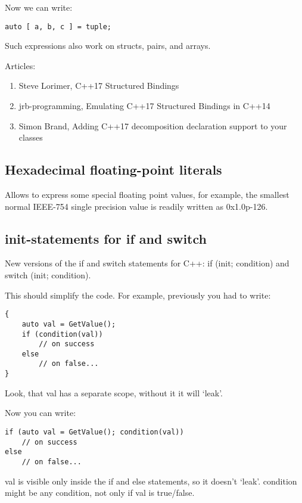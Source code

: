 Now we can write:

\begin{verbatim}
auto [ a, b, c ] = tuple;
\end{verbatim}

Such expressions also work on structs, pairs, and arrays.

Articles:
\begin{enumerate}
\item Steve Lorimer, C++17 Structured Bindings
\item jrb-programming, Emulating C++17 Structured Bindings in C++14
\item Simon Brand, Adding C++17 decomposition declaration support to your classes
\end{enumerate}

\subsection{Hexadecimal floating-point literals}

Allows to express some special floating point values, for example, the smallest normal IEEE-754 single precision value is readily written as 0x1.0p-126.

\subsection{init-statements for if and switch}

New versions of the if and switch statements for C++: if (init; condition) and switch (init; condition). 

This should simplify the code. For example, previously you had to write:

\begin{verbatim}
{   
    auto val = GetValue();   
    if (condition(val))    
        // on success  
    else   
        // on false... 
}
\end{verbatim}

Look, that val has a separate scope, without it it will ‘leak’.

Now you can write:

\begin{verbatim}
if (auto val = GetValue(); condition(val))    
    // on success  
else   
    // on false... 
\end{verbatim}

val is visible only inside the if and else statements, so it doesn’t ‘leak’. 
condition might be any condition, not only if val is true/false.

